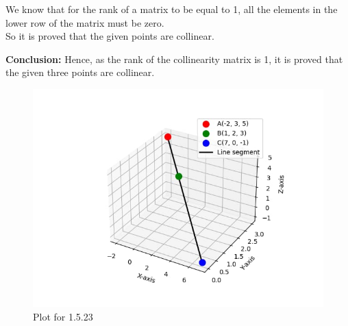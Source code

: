 \documentclass[journal,12pt,onecolumn]{IEEEtran}
\theoremstyle{remark}
\begin{document}
We know that for the rank of a matrix to be equal to 1, all the elements in the lower row of the matrix must be zero.\\
So it is proved that the given points are collinear.\\
\bigskip

\textbf{Conclusion: }
Hence, as the rank of the collinearity matrix is 1, it is proved that the given three points are collinear.


\begin{figure}[H]
    \centering
    \includegraphics[width=1\columnwidth]{figs/1.jpg}
    \caption{Plot for 1.5.23}
    \label{fig:placeholder}
\end{figure}
\end{document}
